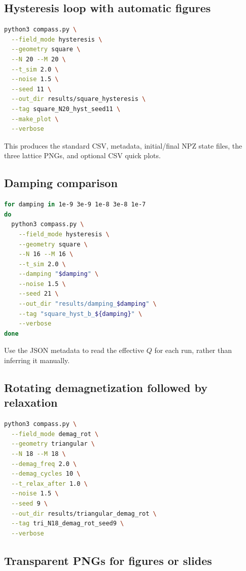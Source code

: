 \documentclass[11pt,a4paper]{article}
\begin{document}
\subsection{Hysteresis loop with automatic figures}

\begin{lstlisting}[language=bash]
python3 compass.py \
  --field_mode hysteresis \
  --geometry square \
  --N 20 --M 20 \
  --t_sim 2.0 \
  --noise 1.5 \
  --seed 11 \
  --out_dir results/square_hysteresis \
  --tag square_N20_hyst_seed11 \
  --make_plot \
  --verbose
\end{lstlisting}

This produces the standard CSV, metadata, initial/final NPZ state files, the three lattice PNGs, and optional CSV quick plots.

\subsection{Damping comparison}

\begin{lstlisting}[language=bash]
for damping in 1e-9 3e-9 1e-8 3e-8 1e-7
do
  python3 compass.py \
    --field_mode hysteresis \
    --geometry square \
    --N 16 --M 16 \
    --t_sim 2.0 \
    --damping "$damping" \
    --noise 1.5 \
    --seed 21 \
    --out_dir "results/damping_$damping" \
    --tag "square_hyst_b_${damping}" \
    --verbose
done
\end{lstlisting}

Use the JSON metadata to read the effective $Q$ for each run, rather than inferring it manually.

\subsection{Rotating demagnetization followed by relaxation}

\begin{lstlisting}[language=bash]
python3 compass.py \
  --field_mode demag_rot \
  --geometry triangular \
  --N 18 --M 18 \
  --demag_freq 2.0 \
  --demag_cycles 10 \
  --t_relax_after 1.0 \
  --noise 1.5 \
  --seed 9 \
  --out_dir results/triangular_demag_rot \
  --tag tri_N18_demag_rot_seed9 \
  --verbose
\end{lstlisting}

\subsection{Transparent PNGs for figures or slides}
\end{document}
